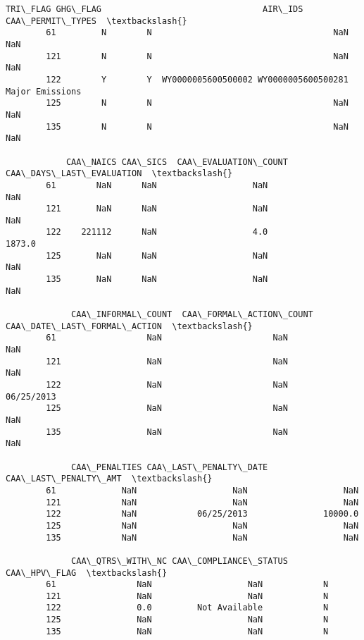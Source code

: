 \documentclass[11pt]{article}
\begin{document}
\begin{Verbatim}[commandchars=\\\{\}]
            TRI\_FLAG GHG\_FLAG                                AIR\_IDS CAA\_PERMIT\_TYPES  \textbackslash{}
        61         N        N                                    NaN              NaN   
        121        N        N                                    NaN              NaN   
        122        Y        Y  WY0000005600500002 WY0000005600500281  Major Emissions   
        125        N        N                                    NaN              NaN   
        135        N        N                                    NaN              NaN   
        
            CAA\_NAICS CAA\_SICS  CAA\_EVALUATION\_COUNT  CAA\_DAYS\_LAST\_EVALUATION  \textbackslash{}
        61        NaN      NaN                   NaN                       NaN   
        121       NaN      NaN                   NaN                       NaN   
        122    221112      NaN                   4.0                    1873.0   
        125       NaN      NaN                   NaN                       NaN   
        135       NaN      NaN                   NaN                       NaN   
        
             CAA\_INFORMAL\_COUNT  CAA\_FORMAL\_ACTION\_COUNT CAA\_DATE\_LAST\_FORMAL\_ACTION  \textbackslash{}
        61                  NaN                      NaN                         NaN   
        121                 NaN                      NaN                         NaN   
        122                 NaN                      NaN                  06/25/2013   
        125                 NaN                      NaN                         NaN   
        135                 NaN                      NaN                         NaN   
        
             CAA\_PENALTIES CAA\_LAST\_PENALTY\_DATE  CAA\_LAST\_PENALTY\_AMT  \textbackslash{}
        61             NaN                   NaN                   NaN   
        121            NaN                   NaN                   NaN   
        122            NaN            06/25/2013               10000.0   
        125            NaN                   NaN                   NaN   
        135            NaN                   NaN                   NaN   
        
             CAA\_QTRS\_WITH\_NC CAA\_COMPLIANCE\_STATUS CAA\_HPV\_FLAG  \textbackslash{}
        61                NaN                   NaN            N   
        121               NaN                   NaN            N   
        122               0.0         Not Available            N   
        125               NaN                   NaN            N   
        135               NaN                   NaN            N   
        

\end{Verbatim}
\end{document}
